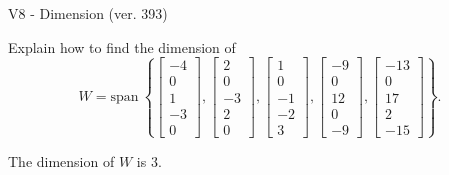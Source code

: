 \begin{exercise}
  \begin{exerciseTitle}V8 - Dimension (ver. 393)\end{exerciseTitle}
  \begin{exerciseStatement}
    Explain how to find the dimension of 
\[W=\mathrm{span}\ \left\{\left[\begin{array}{r}
-4 \\
0 \\
1 \\
-3 \\
0
\end{array}\right] , \left[\begin{array}{r}
2 \\
0 \\
-3 \\
2 \\
0
\end{array}\right] , \left[\begin{array}{r}
1 \\
0 \\
-1 \\
-2 \\
3
\end{array}\right] , \left[\begin{array}{r}
-9 \\
0 \\
12 \\
0 \\
-9
\end{array}\right] , \left[\begin{array}{r}
-13 \\
0 \\
17 \\
2 \\
-15
\end{array}\right]\right\}.\]



  \end{exerciseStatement}
  \begin{exerciseAnswer}
   The dimension of \(W\) is  \(3\).
  


  \end{exerciseAnswer}
\end{exercise}